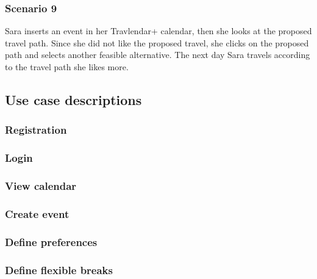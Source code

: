	\subsubsection{Scenario 9}
		Sara inserts an event in her Travlendar+ calendar, then she looks at the proposed travel path. Since she did not like the proposed travel, she clicks on the proposed path and selects another feasible alternative. The next day Sara travels according to the travel path she likes more.	
	
\subsection{Use case descriptions}
\label{subsect:Use case descriptions}

	\subsubsection{Registration}
		
		
	\subsubsection{Login}
		
		
	\subsubsection{View calendar}
		
		
	\subsubsection{Create event}
		
		
	\subsubsection{Define preferences}
		
		
	\subsubsection{Define flexible breaks}
			
		
